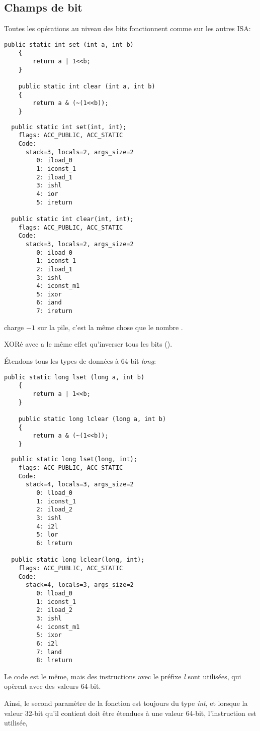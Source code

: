 \subsection{Champs de bit}

Toutes les opérations au niveau des bits fonctionnent comme sur les autres \ac{ISA}:


\begin{lstlisting}[style=customjava]
	public static int set (int a, int b)
	{
		return a | 1<<b;
	}

	public static int clear (int a, int b)
	{
		return a & (~(1<<b));
	}
\end{lstlisting}

\begin{lstlisting}
  public static int set(int, int);
    flags: ACC_PUBLIC, ACC_STATIC
    Code:
      stack=3, locals=2, args_size=2
         0: iload_0
         1: iconst_1
         2: iload_1
         3: ishl
         4: ior
         5: ireturn

  public static int clear(int, int);
    flags: ACC_PUBLIC, ACC_STATIC
    Code:
      stack=3, locals=2, args_size=2
         0: iload_0
         1: iconst_1
         2: iload_1
         3: ishl
         4: iconst_m1
         5: ixor
         6: iand
         7: ireturn
\end{lstlisting}

 charge $-1$ sur la pile, c'est la même chose que le nombre .

XORé avec  a le même effet qu'inverser tous les bits ().

Étendons tous les types de données à 64-bit \emph{long}:


\begin{lstlisting}[style=customjava]
	public static long lset (long a, int b)
	{
		return a | 1<<b;
	}

	public static long lclear (long a, int b)
	{
		return a & (~(1<<b));
	}
\end{lstlisting}

\begin{lstlisting}
  public static long lset(long, int);
    flags: ACC_PUBLIC, ACC_STATIC
    Code:
      stack=4, locals=3, args_size=2
         0: lload_0
         1: iconst_1
         2: iload_2
         3: ishl
         4: i2l
         5: lor
         6: lreturn

  public static long lclear(long, int);
    flags: ACC_PUBLIC, ACC_STATIC
    Code:
      stack=4, locals=3, args_size=2
         0: lload_0
         1: iconst_1
         2: iload_2
         3: ishl
         4: iconst_m1
         5: ixor
         6: i2l
         7: land
         8: lreturn
\end{lstlisting}

Le code est le même, mais des instructions avec le préfixe \emph{l} sont utilisées,
qui opèrent avec des valeurs 64-bit.

Ainsi, le second paramètre de la fonction est toujours du type \emph{int}, et lorsque
la valeur 32-bit qu'il contient doit être étendues à une valeur 64-bit, l'instruction
 est utilisée, 

